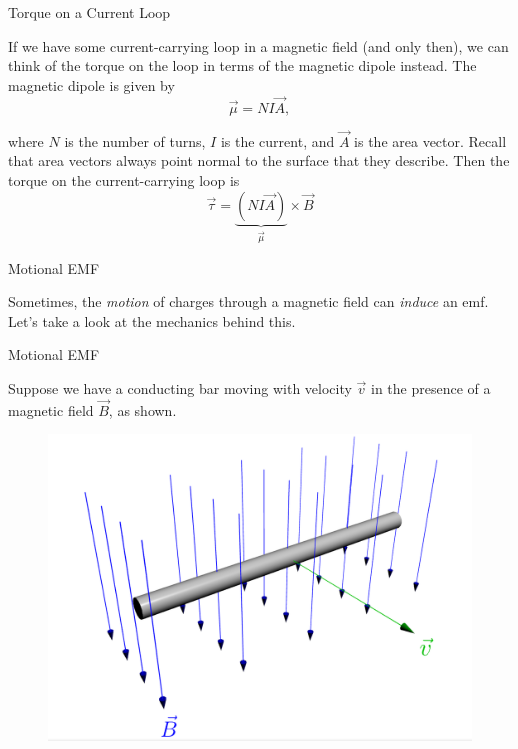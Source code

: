\documentclass{beamer}
\begin{document}
\begin{frame}{Torque on a Current Loop}

If we have some current-carrying loop in a magnetic field (and only then), we can think of the torque on the loop in terms of the magnetic dipole instead. The magnetic dipole is given by
\begin{equation*}
    \vec{\mu} = NI\vec{A},
\end{equation*}

where $N$ is the number of turns, $I$ is the current, and $\vec{A}$ is the area vector. Recall that area vectors always point normal to the surface that they describe. Then the torque on the current-carrying loop is
\begin{equation*}
    \vec{\tau} = \underbrace{\left( NI\vec{A} \right)}_{\vec{\mu}} \times \vec{B}
\end{equation*}

\end{frame}

\begin{frame}{Motional EMF}

Sometimes, the \emph{motion} of charges through a magnetic field can \emph{induce} an emf. Let's take a look at the mechanics behind this.

\end{frame}

\begin{frame}{Motional EMF}

Suppose we have a conducting bar moving with velocity $\vec{v}$ in the presence of a magnetic field $\vec{B}$, as shown.

\begin{figure}[H]
\centering
\includegraphics[scale=0.2]{figures/motionalemf.png}
\end{figure}

\end{frame}
\end{document}
